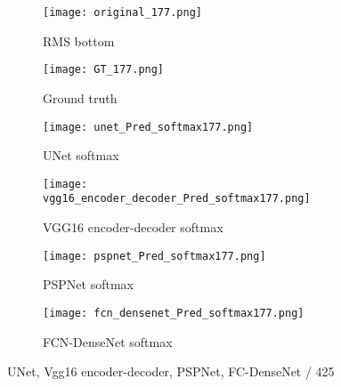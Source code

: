 \begin{figure}[!h]
	\centering
	\begin{subfigure}[b]{0.47\textwidth}
		\centering
		\texttt{[image: original\_177.png]}
		\caption{RMS bottom}
		\label{fig:RMS_flat_shell_Vz_442}
	\end{subfigure}
	\hfill
	\begin{subfigure}[b]{0.47\textwidth}
		\centering
		\texttt{[image: GT\_177.png]}
		\caption{Ground truth}
		\label{fig:m1_rand_single_delam_442}
	\end{subfigure}
	\begin{subfigure}[b]{0.47\textwidth}
		\centering
		\texttt{[image: unet\_Pred\_softmax177.png]}
		\caption{UNet softmax}
		\label{fig:Unet_Pred__softmax442}
	\end{subfigure}
	\hfill
	\begin{subfigure}[b]{0.47\textwidth}
		\centering
		\texttt{[image: vgg16\_encoder\_decoder\_Pred\_softmax177.png]}
		\caption{VGG16 encoder-decoder softmax}			\label{fig:vgg16_pred__softmax442}			
	\end{subfigure}
	\hfill
	\begin{subfigure}[b]{0.47\textwidth}
		\centering
		\texttt{[image: pspnet\_Pred\_softmax177.png]}
		\caption{PSPNet softmax}
		\label{fig:pspnet_pred__softmax442}
	\end{subfigure}	
	\hfill
	\begin{subfigure}[b]{0.47\textwidth}
		\centering
		\texttt{[image: fcn\_densenet\_Pred\_softmax177.png]}
		\caption{FCN-DenseNet softmax}
		\label{fig:fcn_densenet_pred__softmax442}
	\end{subfigure}	
	\caption{UNet, Vgg16 encoder-decoder, PSPNet, FC-DenseNet /  425}
	\label{fig:442_softmax}
\end{figure}
